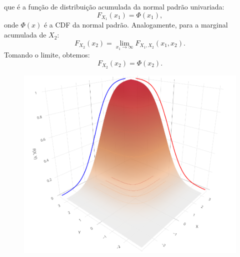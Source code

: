 \begin{frame}
	\begin{block}{}
			que é a função de distribuição acumulada da normal padrão univariada:
		\[
		F_{X_1}(x_1) = \Phi(x_1),
		\]
		onde \( \Phi(x) \) é a CDF da normal padrão. 
		Analogamente, para a marginal acumulada de \( X_2 \):
		\[
		F_{X_2}(x_2) = \lim_{x_1 \to \infty} F_{X_1, X_2}(x_1, x_2).
		\]
		Tomando o limite, obtemos:
		\[
		F_{X_2}(x_2) = \Phi(x_2).
		\]
		\end{block}
		

			\begin{figure}[!htb]
				\begin{center}
					\includegraphics[scale=0.18]{Bivariate.png}
				\end{center}
			\end{figure}
			
			
\end{frame}	



